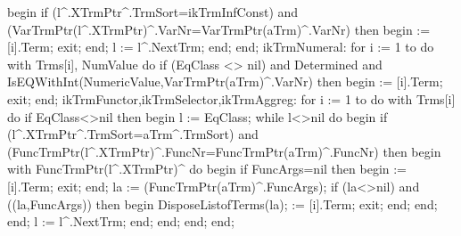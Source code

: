             begin
               if (l^.XTrmPtr^.TrmSort=ikTrmInfConst) and (VarTrmPtr(l^.XTrmPtr)^.VarNr=VarTrmPtr(aTrm)^.VarNr) then
               begin
                   := [i].Term;
                  exit;
               end;
               l := l^.NextTrm;
            end;
         end;
      ikTrmNumeral:
         for i := 1 to  do
            with Trms[i], NumValue do
               if (EqClass <> nil) and Determined and
                     IsEQWithInt(NumericValue,VarTrmPtr(aTrm)^.VarNr) then
               begin
                   := [i].Term;
                  exit;
               end;
      ikTrmFunctor,ikTrmSelector,ikTrmAggreg:
         for i := 1 to  do
            with Trms[i] do
               if EqClass<>nil then
               begin
                  l := EqClass;
                  while l<>nil do
                  begin
                     if (l^.XTrmPtr^.TrmSort=aTrm^.TrmSort) and (FuncTrmPtr(l^.XTrmPtr)^.FuncNr=FuncTrmPtr(aTrm)^.FuncNr) then
                     begin
                        with FuncTrmPtr(l^.XTrmPtr)^ do
                        begin
                           if FuncArgs=nil then
                           begin
                               := [i].Term;
                              exit;
                           end;
                           la := (FuncTrmPtr(aTrm)^.FuncArgs);
                           if (la<>nil) and ((la,FuncArgs)) then
                           begin
                              DisposeListofTerms(la);
                               := [i].Term;
                              exit;
                           end;
                        end;
                     end;
                     l := l^.NextTrm;
                  end;
               end;
   end;
end;
\eatline

